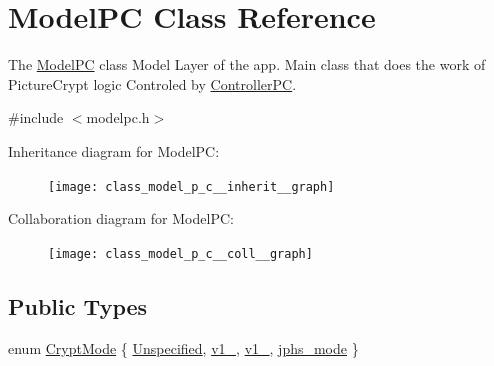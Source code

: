 \hypertarget{class_model_p_c}{}\section{Model\+PC Class Reference}
\label{class_model_p_c}


The \hyperlink{class_model_p_c}{Model\+PC} class Model Layer of the app. Main class that does the work of Picture\+Crypt logic Controled by \hyperlink{class_controller_p_c}{Controller\+PC}.  




{\ttfamily \#include $<$modelpc.\+h$>$}



Inheritance diagram for Model\+PC\+:
\nopagebreak
\begin{figure}[H]
\begin{center}
\leavevmode
\texttt{[image: class\_model\_p\_c\_\_inherit\_\_graph]}
\end{center}
\end{figure}


Collaboration diagram for Model\+PC\+:
\nopagebreak
\begin{figure}[H]
\begin{center}
\leavevmode
\texttt{[image: class\_model\_p\_c\_\_coll\_\_graph]}
\end{center}
\end{figure}
\subsection*{Public Types}
\begin{DoxyCompactItemize}
\item 
enum \hyperlink{class_model_p_c_a296dd7afe3e1c49b3da25fd644fe4ceb}{Crypt\+Mode} \{ \hyperlink{class_model_p_c_a296dd7afe3e1c49b3da25fd644fe4ceba56028870bb6c96c44e7ba33b82d39598}{Unspecified}, 
\hyperlink{class_model_p_c_a296dd7afe3e1c49b3da25fd644fe4ceba7612e38de7178170655a56ddcf96e12c}{v1\+\_}, 
\hyperlink{class_model_p_c_a296dd7afe3e1c49b3da25fd644fe4ceba43138df6b33a6b2bf608768907f95abc}{v1\+\_}, 
\hyperlink{class_model_p_c_a296dd7afe3e1c49b3da25fd644fe4ceba90ca32d3ccbb6be224cdfc33f7096eea}{jphs\+\_\+mode}
 \}
\end{DoxyCompactItemize}
